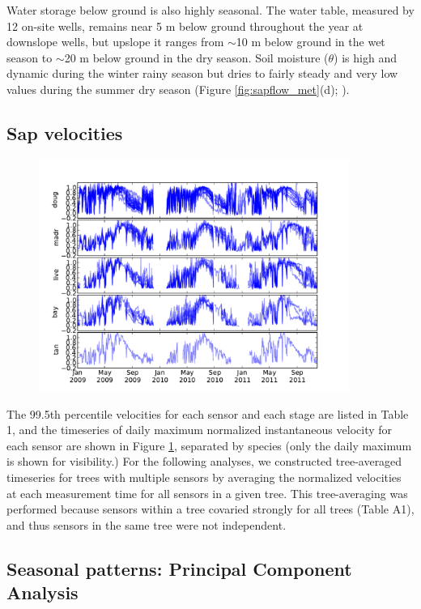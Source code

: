 Water storage below ground is also highly seasonal. The water table, measured by 12 on-site wells, remains near 5 m below ground throughout the year at downslope wells, but upslope it ranges from $\sim$10 m below ground in the wet season to $\sim$20 m below ground in the dry season.   Soil moisture ($\theta$) is high and dynamic during the winter rainy season but dries to fairly steady and very low values during the summer dry season (Figure \ref{fig:sapflow_met}(d); \cite{salve2012rain}).  

\subsection{Sap velocities}

\begin{figure}[here]
\includegraphics[width=0.9\textwidth]{ch1-sapflow/figures/Figure04.pdf}
\caption{}
\label{fig:sapflow_normvel}
\end{figure}

The 99.5th percentile velocities for each sensor and each stage are listed in Table 1, and the timeseries of daily maximum normalized instantaneous velocity for each sensor are shown in Figure \ref{fig:sapflow_normvel}, separated by species (only the daily maximum is shown for visibility.)  For the following analyses, we constructed tree-averaged timeseries for trees with multiple sensors by averaging the normalized velocities at each measurement time for all sensors in a given tree.  This tree-averaging was performed because sensors within a tree covaried strongly for all trees (Table A1), and thus sensors in the same tree were not independent.

\subsection{Seasonal patterns: Principal Component Analysis}
\label{sec:seasonal}

